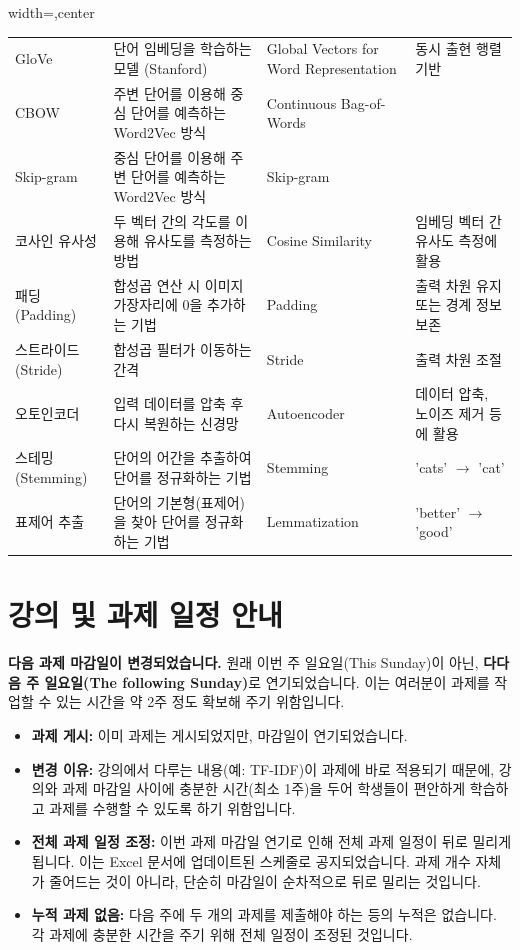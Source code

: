 \documentclass[11pt,a4paper]{article}
\begin{document}
\begin{adjustbox}{width=\textwidth,center}
\begin{tabular}{llll}
GloVe & 단어 임베딩을 학습하는 모델 (Stanford) & Global Vectors for Word Representation & 동시 출현 행렬 기반 \\
CBOW & 주변 단어를 이용해 중심 단어를 예측하는 Word2Vec 방식 & Continuous Bag-of-Words & \\
Skip-gram & 중심 단어를 이용해 주변 단어를 예측하는 Word2Vec 방식 & Skip-gram & \\
코사인 유사성 & 두 벡터 간의 각도를 이용해 유사도를 측정하는 방법 & Cosine Similarity & 임베딩 벡터 간 유사도 측정에 활용 \\
패딩 (Padding) & 합성곱 연산 시 이미지 가장자리에 0을 추가하는 기법 & Padding & 출력 차원 유지 또는 경계 정보 보존 \\
스트라이드 (Stride) & 합성곱 필터가 이동하는 간격 & Stride & 출력 차원 조절 \\
오토인코더 & 입력 데이터를 압축 후 다시 복원하는 신경망 & Autoencoder & 데이터 압축, 노이즈 제거 등에 활용 \\
스테밍 (Stemming) & 단어의 어간을 추출하여 단어를 정규화하는 기법 & Stemming & 'cats' $\rightarrow$ 'cat' \\
표제어 추출 & 단어의 기본형(표제어)을 찾아 단어를 정규화하는 기법 & Lemmatization & 'better' $\rightarrow$ 'good' \\
\bottomrule
\end{tabular}
\end{adjustbox}

\newpage
\section*{강의 및 과제 일정 안내}

\begin{tcolorbox}[mybox, title=과제 마감일 변경]
\textbf{다음 과제 마감일이 변경되었습니다.}
원래 이번 주 일요일(This Sunday)이 아닌, \textbf{다다음 주 일요일(The following Sunday)}로 연기되었습니다.
이는 여러분이 과제를 작업할 수 있는 시간을 약 2주 정도 확보해 주기 위함입니다.
\end{tcolorbox}

\begin{itemize}
    \item \textbf{과제 게시:} 이미 과제는 게시되었지만, 마감일이 연기되었습니다.
    \item \textbf{변경 이유:} 강의에서 다루는 내용(예: TF-IDF)이 과제에 바로 적용되기 때문에, 강의와 과제 마감일 사이에 충분한 시간(최소 1주)을 두어 학생들이 편안하게 학습하고 과제를 수행할 수 있도록 하기 위함입니다.
    \item \textbf{전체 과제 일정 조정:} 이번 과제 마감일 연기로 인해 전체 과제 일정이 뒤로 밀리게 됩니다. 이는 Excel 문서에 업데이트된 스케줄로 공지되었습니다. 과제 개수 자체가 줄어드는 것이 아니라, 단순히 마감일이 순차적으로 뒤로 밀리는 것입니다.
    \item \textbf{누적 과제 없음:} 다음 주에 두 개의 과제를 제출해야 하는 등의 누적은 없습니다. 각 과제에 충분한 시간을 주기 위해 전체 일정이 조정된 것입니다.
\end{itemize}
\end{document}
